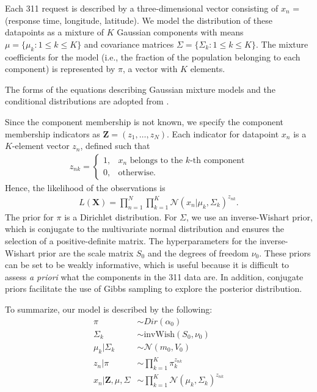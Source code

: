 \documentclass[twoside]{article}
\newcommand{\N}{\mathcal{N}}
\theoremstyle{theorem}
\theoremstyle{theorem}
\theoremstyle{theorem}
\theoremstyle{lemma}
\theoremstyle{definition}
\theoremstyle{example}
\begin{document}
Each 311 request is described by a three-dimensional vector consisting of $x_n$ = (response time, longitude, latitude). We model the distribution of these datapoints as a mixture of $K$ Gaussian components with means $\mu = \{\mu_k :  1\leq k\leq K\}$ and covariance matrices $\Sigma = \{\Sigma_k :  1\leq k\leq K\}$. The mixture coefficients for the model (i.e., the fraction of the population belonging to each component) is represented by $\pi$, a vector with $K$ elements.  

The forms of the equations describing Gaussian mixture models and the conditional distributions are adopted from \cite{Gelman, Jones}.

Since the component membership is not known, we specify the component membership indicators as $\mathbf{Z} = (z_1, \ldots, z_N)$. Each indicator for datapoint $x_n$ is a $K$-element vector $z_n$, defined such that \begin{align}
z_{nk} = \begin{cases}
1, & x_n\text{ belongs to the $k$-th component}\\
0, & \text{otherwise}. 
\end{cases}
\end{align}
Hence, the likelihood of the observations is 
\begin{align}
L(\mathbf{X}) = \prod_{n=1}^N\prod_{k=1}^K \N(x_n| \mu_k, \Sigma_k)^{z_{nk}}.
\end{align}
The prior for $\pi$ is a Dirichlet distribution. For $\Sigma$, we use an inverse-Wishart prior, which is conjugate to the multivariate normal distribution and ensures the selection of a positive-definite matrix. The hyperparameters for the inverse-Wishart prior are the scale matrix $S_0$ and the degrees of freedom $\nu_0$.  These priors can be set to be weakly informative, which is useful because it is difficult to assess \textit{a priori} what the components in the 311 data are. In addition, conjugate priors facilitate the use of Gibbs sampling to explore the posterior distribution. 

To summarize, our model is described by the following: 
\begin{align}
\pi &\sim Dir(\alpha_0)\\
\Sigma_k &\sim \mathrm{invWish}(S_0, \nu_0)\\
\mu_k | \Sigma_k &\sim \N(m_0, V_0)\\
z_n | \pi &\sim \prod_{k=1}^K \pi_k^{z_{nk}}\\
x_n | \mathbf{Z}, \mu, \Sigma &\sim \prod_{k=1}^K \N(\mu_k, \Sigma_k)^{z_{nk}}
\end{align}
\end{document}
